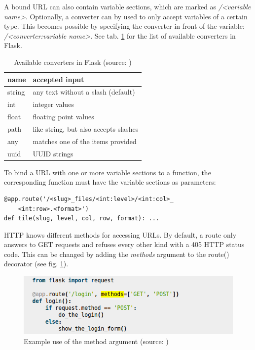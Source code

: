 A bound URL can also contain variable sections, which are marked as \emph{/{\textless}variable name{\textgreater}}. Optionally, a converter can by used to only accept variables of a certain type. This becomes possible by specifying the converter in front of the variable: \emph{/{\textless}converter:variable name{\textgreater}}\cite{web:flask}. See tab. \ref{tab4_converter} for the list of available converters in Flask.

\begin{table}[H]
	\begin{center}
		\begin{tabular}{| l | l |}
			\hline
			\textbf{name} & \textbf{accepted input}\\ \hline
			string & any text without a slash (default)\\ \hline
			int & integer values\\ \hline
			float & floating point values\\ \hline
			path & like string, but also accepts slashes \\ \hline
			any & matches one of the items provided\\ \hline
			uuid & UUID strings\\ \hline
		\end{tabular}
		\caption{Available converters in Flask (source: \cite{web:flask})}
		\label{tab4_converter}
	\end{center}
\end{table}

To bind a URL with one or more variable sections to a function, the corresponding function must have the variable sections as parameters:

\begin{lstlisting}[frame=single]
@app.route('/<slug>_files/<int:level>/<int:col>_
	<int:row>.<format>')
def tile(slug, level, col, row, format): ...
\end{lstlisting}

HTTP knows different methods for accessing URLs. By default, a route only answers to GET requests and refuses every other kind with a 405 HTTP status code. This can be changed by adding the \emph{methods} argument to the route() decorator (see fig. \ref{fig4_methods})\cite{web:flask}.

\begin{figure}[H]
	\begin{center}
		\includegraphics[scale=0.5]{img/HTTPmethods.png}
		\caption{Example use of the method argument (source: \cite{web:flask})}
		\label{fig4_methods}
	\end{center}
\end{figure}

